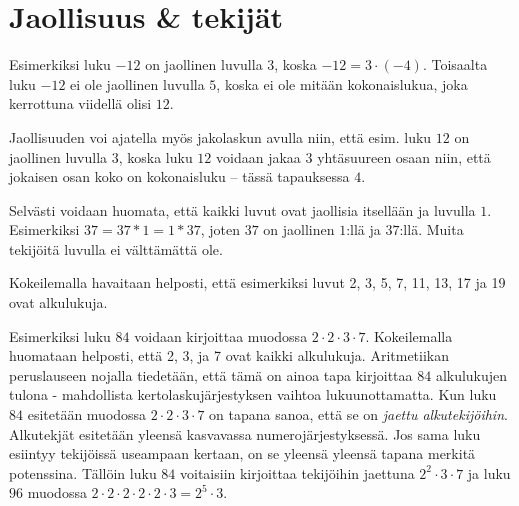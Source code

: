 \chapter{Jaollisuus \& tekijät}


Esimerkiksi luku $-12$ on jaollinen luvulla $3$, koska $-12=3\cdot (-4)$. Toisaalta luku $-12$ ei ole jaollinen luvulla $5$, koska ei ole mitään kokonaislukua, joka kerrottuna viidellä olisi $12$.

Jaollisuuden voi ajatella myös jakolaskun avulla niin, että esim. luku $12$ on jaollinen luvulla $3$, koska luku $12$ voidaan jakaa $3$ yhtäsuureen osaan niin, että jokaisen osan koko on kokonaisluku -- tässä tapauksessa $4$.

Selvästi voidaan huomata, että kaikki luvut ovat jaollisia itsellään ja luvulla $1$. Esimerkiksi $37=37*1=1*37$, joten $37$ on jaollinen $1$:llä ja $37$:llä. Muita tekijöitä luvulla ei välttämättä ole.


Kokeilemalla havaitaan helposti, että esimerkiksi luvut 2, 3, 5, 7, 11, 13, 17 ja 19 ovat alkulukuja. 


Esimerkiksi luku $84$ voidaan kirjoittaa muodossa $2\cdot 2\cdot 3\cdot 7$. Kokeilemalla huomataan helposti, että 2, 3, ja 7 ovat kaikki alkulukuja. Aritmetiikan peruslauseen nojalla tiedetään, että tämä on ainoa tapa kirjoittaa $84$ alkulukujen tulona - mahdollista kertolaskujärjestyksen vaihtoa lukuunottamatta. Kun luku $84$ esitetään muodossa $2\cdot 2\cdot 3\cdot 7$ on tapana sanoa, että se on \emph{jaettu alkutekijöihin}. Alkutekjät esitetään yleensä kasvavassa numerojärjestyksessä. Jos sama luku esiintyy tekijöissä useampaan kertaan, on se yleensä yleensä tapana merkitä potenssina. Tällöin luku $84$ voitaisiin kirjoittaa tekijöihin jaettuna $2^2\cdot 3\cdot 7$ ja luku $96$ muodossa $2\cdot 2\cdot 2\cdot 2\cdot 2\cdot 3=2^5\cdot 3$.

